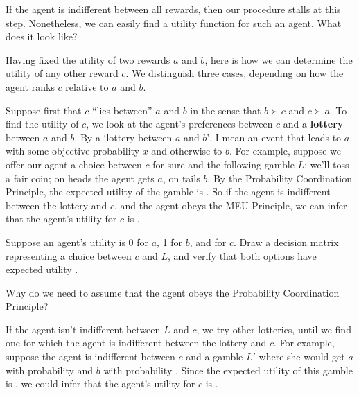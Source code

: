\begin{exercise2}
  If the agent is indifferent between all rewards, then our procedure
  stalls at this step. Nonetheless, we can easily find a utility
  function for such an agent. What does it look like? 
\end{exercise2}

Having fixed the utility of two rewards $a$ and $b$, here is how we
can determine the utility of any other reward $c$. We distinguish
three cases, depending on how the agent ranks $c$ relative to $a$ and
$b$.

Suppose first that $c$ ``lies between'' $a$ and $b$ in the sense that
$b \succ c$ and $c \succ a$. To find the utility of $c$, we look at
the agent's preferences between $c$ and a \textbf{lottery} between $a$
and $b$. By a `lottery between $a$ and $b$', I mean an event that
leads to $a$ with some objective probability $x$ and otherwise to $b$.
For example, suppose we offer our agent a choice between $c$ for sure
and the following gamble $L$: we'll toss a fair coin; on heads the
agent gets $a$, on tails $b$. By the Probability Coordination
Principle, the expected utility of the gamble is%
\cmnt{%
\[
  EU(L) = \nicefrac{1}{2} \cdot U(a) + \nicefrac{1}{2} \cdot U(b) =  
   \nicefrac{1}{2} \cdot 0 + \nicefrac{1}{2} \cdot 1 = \nicefrac{1}{2}. 
\]
} %
. So if the agent is indifferent between the lottery and $c$, and
the agent obeys the MEU Principle, we can infer that the agent's utility for $c$
is .

\begin{exercise1}
  Suppose an agent's utility is 0 for $a$, 1 for $b$, and
   for $c$. Draw a decision matrix representing a
  choice between $c$ and $L$, and verify that both options have
  expected utility .
\end{exercise1}

\begin{exercise2}
  Why do we need to assume that the agent obeys the Probability
  Coordination Principle?
\end{exercise2}

If the agent isn't indifferent between $L$ and $c$, we try other
lotteries, until we find one for which the agent is indifferent
between the lottery and $c$.%
For example, suppose the agent is indifferent between $c$ and a gamble
$L'$ where she would get $a$ with probability  and $b$
with probability . Since the expected utility of this
gamble is , we could infer that the agent's
utility for $c$ is .

